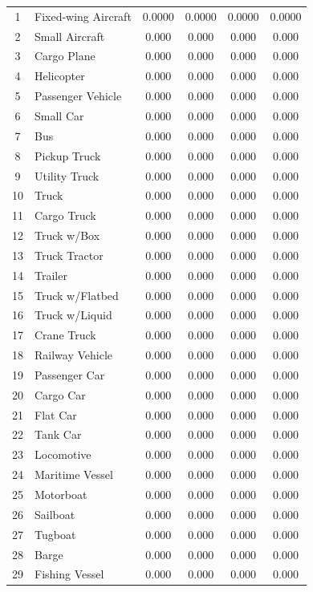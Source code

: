 \begin{center}
\begin{longtable}{|c|l|c|c|c|c|}
1 & Fixed-wing Aircraft & 0.0000 & 0.0000 & 0.0000 & 0.0000\\
2 & Small Aircraft & 0.000 & 0.000 & 0.000 & 0.000\\
3 & Cargo Plane & 0.000 & 0.000 & 0.000 & 0.000\\
4 & Helicopter & 0.000 & 0.000 & 0.000 & 0.000\\
5 & Passenger Vehicle & 0.000 & 0.000 & 0.000 & 0.000\\
6 & Small Car & 0.000 & 0.000 & 0.000 & 0.000\\
7 & Bus & 0.000 & 0.000 & 0.000 & 0.000\\
8 & Pickup Truck & 0.000 & 0.000 & 0.000 & 0.000\\
9 & Utility Truck & 0.000 & 0.000 & 0.000 & 0.000\\
10 & Truck & 0.000 & 0.000 & 0.000 & 0.000\\
11 & Cargo Truck & 0.000 & 0.000 & 0.000 & 0.000\\
12 & Truck w/Box & 0.000 & 0.000 & 0.000 & 0.000\\
13 & Truck Tractor & 0.000 & 0.000 & 0.000 & 0.000\\
14 & Trailer & 0.000 & 0.000 & 0.000 & 0.000\\
15 & Truck w/Flatbed & 0.000 & 0.000 & 0.000 & 0.000\\
16 & Truck w/Liquid & 0.000 & 0.000 & 0.000 & 0.000\\
17 & Crane Truck & 0.000 & 0.000 & 0.000 & 0.000\\
18 & Railway Vehicle & 0.000 & 0.000 & 0.000 & 0.000\\
19 & Passenger Car & 0.000 & 0.000 & 0.000 & 0.000\\
20 & Cargo Car & 0.000 & 0.000 & 0.000 & 0.000\\
21 & Flat Car & 0.000 & 0.000 & 0.000 & 0.000\\
22 & Tank Car & 0.000 & 0.000 & 0.000 & 0.000\\
23 & Locomotive & 0.000 & 0.000 & 0.000 & 0.000\\
24 & Maritime Vessel & 0.000 & 0.000 & 0.000 & 0.000\\
25 & Motorboat & 0.000 & 0.000 & 0.000 & 0.000\\
26 & Sailboat & 0.000 & 0.000 & 0.000 & 0.000\\
27 & Tugboat & 0.000 & 0.000 & 0.000 & 0.000\\
28 & Barge & 0.000 & 0.000 & 0.000 & 0.000\\
29 & Fishing Vessel & 0.000 & 0.000 & 0.000 & 0.000\\

\end{longtable}
\end{center}

